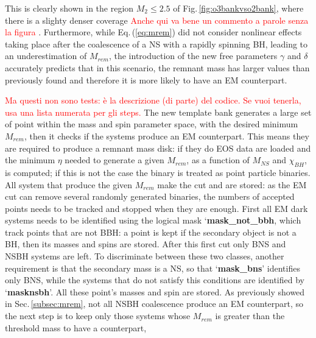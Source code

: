 \documentclass[binding=0.6cm, LaM]{sapthesis}
\newcommand{\fpg}[1]{\textcolor{red}{#1} }
\begin{document}
        This is clearly shown in the region $M_2 \leq 2.5$ of Fig.\,\ref{fig:o3bankvso2bank}, where there is a slighty denser coverage \fpg{Anche qui va bene un commento a parole senza la figura}.
        Furthermore, while Eq.\,(\ref{eq:mrem}) did not consider nonlinear effects taking place after the coalescence of a NS
        with a rapidly spinning BH, leading to an underestimation of $M_{rem}$,
        the introduction of the new free parameters $\gamma$ and $\delta$ accurately predicts that in this scenario,
        the remnant mass has larger values than previously found and therefore it is more likely to have an EM counterpart.

        \fpg{Ma questi non sono tests: \`e la descrizione (di parte) del codice. Se vuoi tenerla, usa una lista numerata per gli steps.}
       The new template bank generates a large set of point within the mass and spin parameter space,
        with the desired minimum $M_{rem}$, then it checks if the systems produce an EM counterpart.
        This means they are required to produce a remnant mass disk:
        if they do EOS data are loaded and the minimum $\eta$ needed to generate a given $M_{rem}$,
        as a function of $M_{NS}$ and $\chi_{BH}$,  is computed;
        if this is not the case the binary is treated as point particle binaries.
        All system that produce the given $M_{rem}$ make the cut and are stored:
        as the EM cut can remove several randomly generated binaries,
        the numbers of accepted points needs to be tracked and stopped when they are enough.
        First all EM dark systems needs to be identified using the logical mask ‘\textbf{{\color{red}mask\_not\_bbh}},
        which track points that are not BBH: a point is kept if the secondary object is not a BH,
        then its masses and spins are stored.
        After this first cut only BNS and NSBH systems are left.
        To discriminate between these two classes, another requirement is that the secondary mass is a NS,
        so that ‘\textbf{{\color{green}mask\_bns}}’ identifies only BNS, while the systems that do not satisfy this conditions
        are identified by ‘\textbf{{\color{black}masknsbh}}’.
        All these point’s masses and spin are stored.
        As previously showed in Sec.\,\ref{subsec:mrem}, not all NSBH coalescence produce an EM counterpart,
        so the next step is to keep only those systems whose $M_{rem}$ is greater than the threshold mass to have a counterpart,
\end{document}
